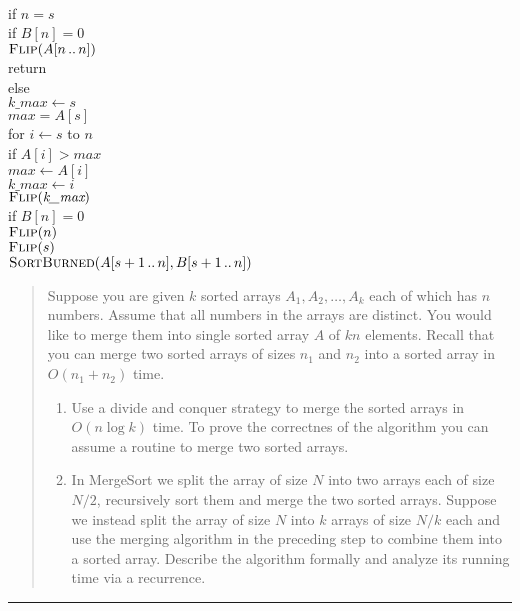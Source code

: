 \documentclass[11pt]{article}
\begin{document}
\begin{solution}
\begin{enumerate}
			\begin{center}
			\begin{algorithm}			
			\+
			\\ if $\textit{n} = s$\+
			\\	if $\textit{B}[n] = 0$\+
			\\ 	$\textsc{Flip}(A[n\,..\,n])$\-
			\\	return\-
			\\ else\+
			\\ $\textit{k\_max} \gets s$
			\\ $\textit{max} = A[s]$
			\\ for $\textit{i} \gets s$ to $n$\+
			\\	if $A[\textit{i}] > \textit{max}$\+
			\\  	$\textit{max} \gets A[i]$
			\\		$\textit{k\_max} \gets i$\-\-
			\\ $\textsc{Flip}(\textit{k\_max})$
			\\ if $\textit{B}[n] = 0$\+
			\\ 	$\textsc{Flip}(n)$\-
			\\ $\textsc{Flip}(s)$
			\\ $\textsc{SortBurned}(A[s + 1\,..\,n], B[s + 1\,..\,n])$
			
		\end{algorithm}
		\end{center}
		
	\end{enumerate}
\end{solution}
\clearpage



\begin{quote}
	Suppose you are given $k$ sorted arrays $A_1,A_2,\ldots,A_k$
  each of which has $n$ numbers. Assume that all numbers in the arrays
  are distinct. You would like to merge them into single sorted array
  $A$ of $kn$ elements. Recall that you can merge two sorted arrays of
  sizes $n_1$ and $n_2$ into a sorted array in $O(n_1+n_2)$ time.
  \begin{enumerate}
  \item Use a divide and conquer strategy to merge the sorted arrays
    in $O(n \log k)$ time. To prove the correctnes of the algorithm
    you can assume a routine to merge two sorted arrays.
  \item In MergeSort we split the array of size $N$ into two arrays
    each of size $N/2$, recursively sort them and merge the two sorted
    arrays. Suppose we instead split the array of size $N$ into $k$
    arrays of size $N/k$ each and use the merging algorithm in the
    preceding step to combine them into a sorted array.  Describe the
    algorithm formally and analyze its running time via a recurrence.
  \end{enumerate}
\end{quote}
\hrule
\end{document}
